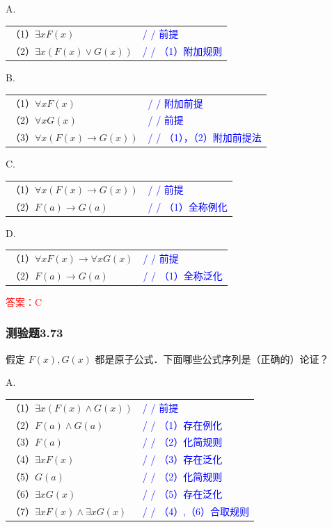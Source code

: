\documentclass[UTF8, heading=true]{ctexart}
\begin{document}
A.

\begin{tabular}{ll}
  （1）$\exists x F(x)$ & \textcolor{blue}{/ / 前提} \\
  （2）$\exists x(F(x) \vee G(x))$ & \textcolor{blue}{/ / （1）附加规则}
\end{tabular}


B.

\begin{tabular}{ll}
  （1）$\forall x F(x)$ & \textcolor{blue}{/ / 附加前提} \\
  （2）$\forall x G(x)$ & \textcolor{blue}{/ / 前提} \\
  （3）$\forall x(F(x) \rightarrow G(x))$ & \textcolor{blue}{/ / （1），（2）附加前提法}
\end{tabular}


C.

\begin{tabular}{ll}
  （1）$\forall x(F(x) \rightarrow G(x))$ & \textcolor{blue}{/ / 前提} \\
  （2）$F(a) \rightarrow G(a)$ & \textcolor{blue}{/ / （1）全称例化}
\end{tabular}

D.

\begin{tabular}{ll}
  （1）$\forall x F(x) \rightarrow \forall x G(x)$ & \textcolor{blue}{/ / 前提} \\
  （2）$F(a) \rightarrow G(a)$ & \textcolor{blue}{/ / （1）全称泛化}
\end{tabular}

\textcolor{red}{答案：C}

\subsubsection{测验题3.73}

假定 $F(x), G(x)$ 都是原子公式．下面哪些公式序列是（正确的）论证？

A.

\begin{tabular}{ll}
  （1）$\exists x(F(x) \wedge G(x))$ & \textcolor{blue}{/ / 前提} \\
  （2）$F(a) \wedge G(a)$ & \textcolor{blue}{/ / （1）存在例化} \\
  （3）$F(a)$ & \textcolor{blue}{/ / （2）化简规则} \\
  （4）$\exists x F(x)$ & \textcolor{blue}{/ / （3）存在泛化} \\
  （5）$G(a)$ & \textcolor{blue}{/ / （2）化简规则} \\
  （6）$\exists x G(x)$ & \textcolor{blue}{/ / （5）存在泛化} \\
  （7）$\exists x F(x) \wedge \exists x G(x)$ & \textcolor{blue}{/ / （4）,（6）合取规则}
\end{tabular}
\end{document}
